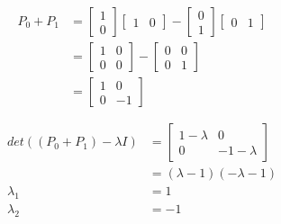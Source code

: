 \documentclass{article}
\begin{document}
\begin{align*}
    \begin{split}
        P_0 + P_1 &= \begin{bmatrix} 1 \\ 0 \end{bmatrix} \begin{bmatrix} 1 & 0 \end{bmatrix} - \begin{bmatrix} 0 \\ 1 \end{bmatrix} \begin{bmatrix} 0 & 1 \end{bmatrix} \\
        & = \begin{bmatrix} 1 & 0 \\ 0 & 0 \end{bmatrix} - \begin{bmatrix} 0 & 0 \\ 0 & 1 \end{bmatrix} \\
        &= \begin{bmatrix} 1 & 0 \\ 0 & -1 \end{bmatrix} \\
    \end{split}
\end{align*}
\begin{align*}
    \begin{split}
        det((P_0 + P_1)- \lambda I)
        &=
        \begin{bmatrix}
            1 - \lambda & 0 \\
            0 & -1 - \lambda
        \end{bmatrix} \\
        &= (\lambda - 1)(- \lambda - 1) \\
        \lambda_1 &= 1 \\
        \lambda_2 &= -1 \\
    \end{split}
\end{align*}
\end{document}
